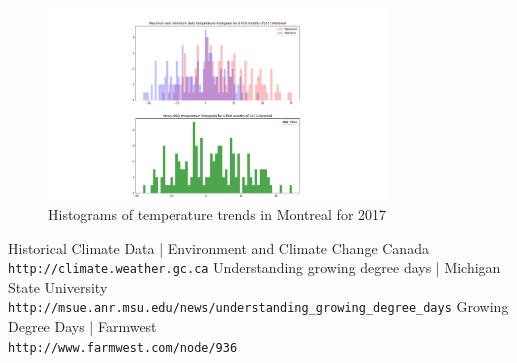 \documentclass[12pt]{article}
\begin{document}
\begin{figure}[!htbp]
\centering
\includegraphics[width=0.8\textwidth]{./docs/histogram2017.png} 
\caption{\scriptsize Histograms of temperature trends in Montreal for 2017}
\label{hist2017}		  
\end{figure}


\pagebreak




\begin{thebibliography}{2}
Historical Climate Data | Environment and Climate Change Canada
\\\texttt{http://climate.weather.gc.ca}
Understanding growing degree days | Michigan State University
\\\texttt{http://msue.anr.msu.edu/news/understanding\_growing\_degree\_days}
Growing Degree Days | Farmwest
\\\texttt{http://www.farmwest.com/node/936}
\end{thebibliography}
\end{document}
